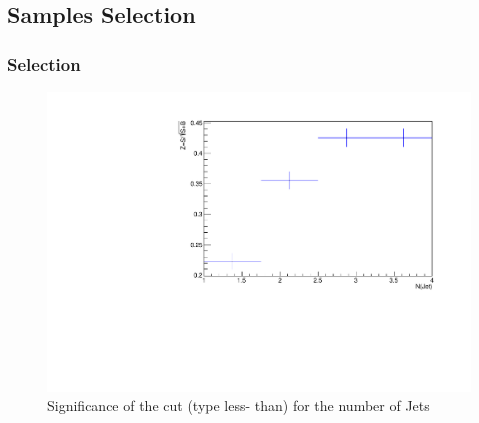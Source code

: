 \documentclass{beamer}
\begin{document}

\begin{frame}
\section{Samples Selection}
\frametitle{Selection}


\begin{figure}[!h]
	
	\centering
	\includegraphics[scale=0.45]{pictures/Selection/SigLT_NJet}
	\caption{ Significance of the cut (type less-
		than) for the number of Jets\label{}}
	
\end{figure}


\end{frame}

\end{document}
